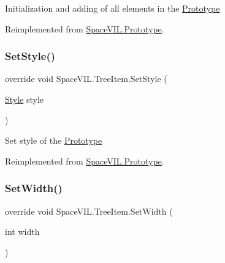 Initialization and adding of all elements in the \mbox{\hyperlink{class_space_v_i_l_1_1_prototype}{Prototype}} 



Reimplemented from \mbox{\hyperlink{class_space_v_i_l_1_1_prototype_ac3379fe02923ee155b5b0084abf27420}{Space\+V\+I\+L.\+Prototype}}.

\mbox{\label{class_space_v_i_l_1_1_tree_item_ab12f4f097b10e2a0c7f0b5fd311449d4}} 
\subsubsection{\texorpdfstring{Set\+Style()}{SetStyle()}}
{\footnotesize\ttfamily override void Space\+V\+I\+L.\+Tree\+Item.\+Set\+Style (\begin{DoxyParamCaption}\item[{\mbox{\hyperlink{class_space_v_i_l_1_1_decorations_1_1_style}{Style}}}]{style }\end{DoxyParamCaption})\hspace{0.3cm}{\ttfamily [virtual]}}



Set style of the \mbox{\hyperlink{class_space_v_i_l_1_1_prototype}{Prototype}} 



Reimplemented from \mbox{\hyperlink{class_space_v_i_l_1_1_prototype_ae96644a6ace490afb376fb542161e541}{Space\+V\+I\+L.\+Prototype}}.

\mbox{\label{class_space_v_i_l_1_1_tree_item_aa10abe8a9dafe4d597e041500618ec03}} 
\subsubsection{\texorpdfstring{Set\+Width()}{SetWidth()}}
{\footnotesize\ttfamily override void Space\+V\+I\+L.\+Tree\+Item.\+Set\+Width (\begin{DoxyParamCaption}\item[{int}]{width }\end{DoxyParamCaption})\hspace{0.3cm}{\ttfamily [virtual]}}



